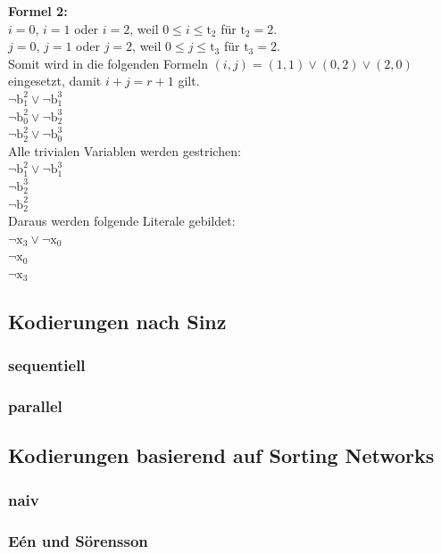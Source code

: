\documentclass[a4,abstract=on]{scrartcl}
\begin{document}
\textbf{Formel 2:}\\
$i=0$, $i=1$ oder $i=2$, weil $0\leq i \leq \text{t}_2$ für $\text{t}_2 = 2$.\\
$j=0$, $j=1$ oder $j=2$, weil $0\leq j \leq \text{t}_3$ für $\text{t}_3=2$.\\
Somit wird in die folgenden Formeln $(i,j) = (1,1) \vee (0,2) \vee (2,0)$ eingesetzt, damit $i+j = r+1$ gilt.\\
$\neg \text{b}_1^2 \vee \neg \text{b}_1^3$\\
$\neg \text{b}_0^2 \vee \neg \text{b}_2^3$\\
$\neg \text{b}_2^2 \vee \neg \text{b}_0^3$\\

Alle trivialen Variablen werden gestrichen:\\
$\neg \text{b}_1^2 \vee \neg \text{b}_1^3$\\
$\neg \text{b}_2^3$\\
$\neg \text{b}_2^2$ \\

Daraus werden folgende Literale gebildet:\\
$\neg \text{x}_3 \vee \neg \text{x}_0$\\
$\neg \text{x}_0$\\
$\neg \text{x}_3$\\



		

	\subsection{Kodierungen nach Sinz}
		\subsubsection{sequentiell}
		\subsubsection{parallel}

	\subsection{Kodierungen basierend auf Sorting Networks}
		\subsubsection{naiv}
		\subsubsection{Eén und Sörensson}
\end{document}
